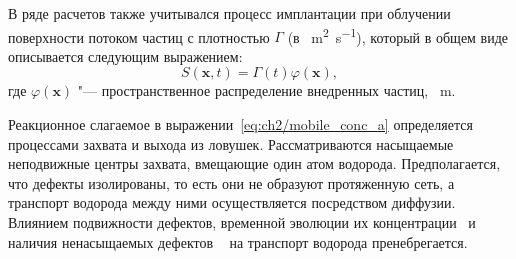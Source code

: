  В ряде расчетов также учитывался процесс имплантации при облучении поверхности потоком частиц с плотностью \( \Gamma \) (в \si{\per\meter\squared\per\second}), который в общем виде описывается следующим выражением:
\begin{equation}
    \label{eq:ch2/impl_source}
    S(\mathbf{x},t)=\Gamma(t)\varphi(\mathbf{x}),
\end{equation}
где \( \varphi(\mathbf{x}) \) "--- пространственное распределение внедренных частиц, \si{\per\meter}.

Реакционное слагаемое в выражении~\eqref{eq:ch2/mobile_conc_a} определяется процессами захвата и выхода из ловушек. Рассматриваются насыщаемые неподвижные центры захвата, вмещающие один атом водорода. Предполагается, что дефекты изолированы, то есть они не образуют протяженную сеть, а транспорт водорода между ними осуществляется посредством диффузии. Влиянием подвижности дефектов, временной эволюции их концентрации~\cite{Dark2024} и наличия ненасыщаемых дефектов ~\cite{Zibrov2024} на транспорт водорода пренебрегается.

